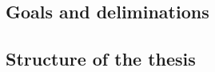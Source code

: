 \subsection{Goals and deliminations}

%
\begin{comment}
INSTRUCTIONS FOR WRITING A MASTER'S THESIS

Express the goals for the work, include also the delimitations. This way the reader knows
when the results are valid and she can place the work in a proper framework and scope. 
It is also important to say, what is not done during the work for the thesis. Then the
thesis will show how the goals are met. In the thesis this subsection occupies from 1 to 2
pages.
\end{comment}

\subsection{Structure of the thesis}

%
\begin{comment}
INSTRUCTIONS FOR WRITING A MASTER'S THESIS

This subsection contains a short description for the contents of the thesis. The contents of
each section are characterized with one or two sentences. For example: ”Section 2 contains
a description of the ...”. In the thesis this subsection occupies at most one page, in many
cases half a page is enough. At this point, one should thoroughly consider the structure of
work. Discuss with your supervisor about the structure.
\end{comment}
%
\begin{comment}
FINAL THESIS INSTRUCTIONS.

The actual research report is opened with an introduction. The purpose of the introduction is to
introduce the topic and awaken the reader's interest. The introduction briefly describes the
background, material extent and aims of the thesis. The introduction relates the thesis to other
research and sources and presents the research methodology applied. It also describes the key
points and organisation of the research report. It does not, however, include detailed descriptions 
of the theory, methods or results. A good introduction is, nevertheless, significantly longer than a
couple of pages, and is organised in a logical manner.
\end{comment}